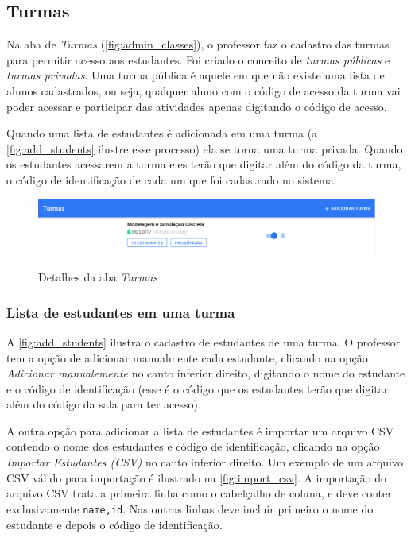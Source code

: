 \subsection{Turmas}
\label{subsection:turmas}

Na aba de \textit{Turmas} (\autoref{fig:admin_classes}), o professor faz o cadastro das turmas
para permitir acesso aos estudantes. Foi criado o conceito de \textit{turmas públicas}
e \textit{turmas privadas}. Uma turma pública é aquele em que não existe uma
lista de alunos cadastrados, ou seja, qualquer aluno com o código de acesso da turma
vai poder acessar e participar das atividades apenas digitando o código de acesso.

Quando uma lista de estudantes é adicionada em uma turma (a \autoref{fig:add_students} ilustre esse processo) ela se
torna uma turma privada. Quando os estudantes acessarem a turma eles terão que
digitar além do código da turma, o código de identificação de cada um que foi cadastrado no sistema.

\begin{figure}[ht]
  \centering
  \caption{Detalhes da aba \textit{Turmas}}
  \includegraphics[scale=.42]{imagens/telas/admin_classes}
  \doautor
  \label{fig:admin_classes}
\end{figure}

\subsubsection{Lista de estudantes em uma turma}

A \autoref{fig:add_students} ilustra o cadastro de estudantes de uma turma.
O professor tem a opção de adicionar manualmente cada estudante, clicando
na opção \textit{Adicionar manualemente} no canto inferior direito, digitando
o nome do estudante e o código de identificação (esse é o código que os estudantes
terão que digitar além do código da sala para ter acesso).

A outra opção para adicionar a lista de estudantes é importar um arquivo CSV
contendo o nome dos estudantes e código de identificação, clicando
na opção \textit{Importar Estudantes (CSV)} no canto inferior direito. Um exemplo de um
arquivo CSV válido para importação é ilustrado na \autoref{fig:import_csv}.
A importação do arquivo CSV trata a primeira linha como o cabelçalho de coluna,
e deve conter exclusivamente \texttt{name,id}. Nas outras linhas deve incluir
primeiro o nome do estudante e depois o código de identificação.

